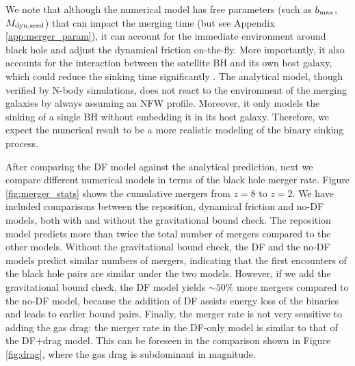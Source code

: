We note that although the numerical model has free parameters (such as $b_{\rm max}$, $M_{\rm dyn, seed}$) that can impact the merging time (but see Appendix \ref{app:merger_param}), it can account for the immediate environment around black hole and adjust the dynamical friction on-the-fly. More importantly, it also accounts for the interaction between the satellite BH and its own host galaxy, which could reduce the sinking time significantly \citep[e.g.][]{Dosopoulou2017}. 
The analytical model, though verified by N-body simulations, does not react to the environment of the merging galaxies by always assuming an NFW profile. Moreover, it only models the sinking of a single BH without embedding it in its host galaxy. Therefore, we expect the numerical result to be a more realistic modeling of the binary sinking process.

After comparing the DF model against the analytical prediction, next we compare different numerical models in terms of the black hole merger rate. Figure \ref{fig:merger_stats} shows the cumulative mergers from $z=8$ to $z=2$. We have included comparisons between the reposition, dynamical friction and no-DF models, both with and without the gravitational bound check. The reposition model predicts more than twice the total number of mergers compared to the other models. Without the gravitational bound check, the DF and the no-DF models predict similar numbers of mergers, indicating that the first encounters of the black hole pairs are similar under the two models. However, if we add the gravitational bound check, the DF model yields $\sim 50\%$ more mergers compared to the no-DF model, because the addition of DF assists energy loss of the binaries and leads to earlier bound pairs. Finally, the merger rate is not very sensitive to adding the gas drag: the merger rate in the DF-only model is similar to that of the DF+drag model. This can be foreseen in the comparison shown in Figure \ref{fig:drag}, where the gas drag is subdominant in magnitude.
